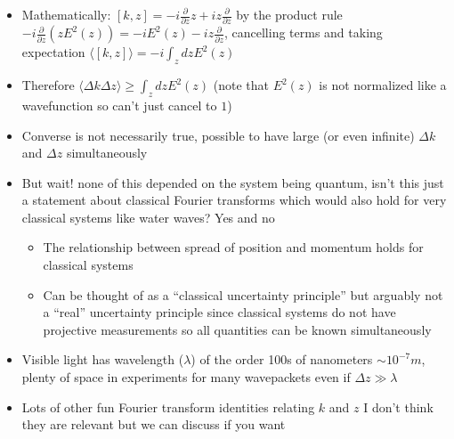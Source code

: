 \documentclass[english]{article}
\newcommand{\average}[1]{\langle #1 \rangle}
\begin{document}
\begin{itemize}
\item Mathematically: $[k,z]=-i\frac{\partial}{\partial  z} z+i z \frac{\partial}{\partial z}$ by the product rule $-i\frac{\partial}{\partial  z}  (z E^2(z))=-iE^2(z)-i z \frac{\partial}{\partial z}$, cancelling terms and taking expectation $\average{[k,z]}=-i\int_zdzE^2(z)$
\item Therefore $\average{\Delta k \Delta z}\ge \int_zdzE^2(z)$ (note that $E^2(z)$ is not normalized like a wavefunction so can't just cancel to $1$)
\item Converse is not necessarily true, possible to have large (or even infinite) $\Delta k$ and $\Delta z$ simultaneously
\item But wait! none of this depended on the system being quantum, isn't this just a statement about classical Fourier transforms which would also hold for very classical systems like water waves? Yes and no
\begin{itemize}
\item The relationship between spread of position and momentum holds for classical systems
\item Can be thought of as a ``classical uncertainty principle'' but arguably not a ``real'' uncertainty principle since classical systems do not have projective measurements so all quantities can be known simultaneously
\end{itemize}
\item Visible light has wavelength ($\lambda$) of the order 100s of nanometers $\sim 10^{-7} m$, plenty of space in experiments for many wavepackets even if $\Delta z \gg \lambda$ 
\item Lots of other fun Fourier transform identities relating $k$ and $z$ I don't think they are relevant but we can discuss if you want
\end{itemize}
\end{document}
